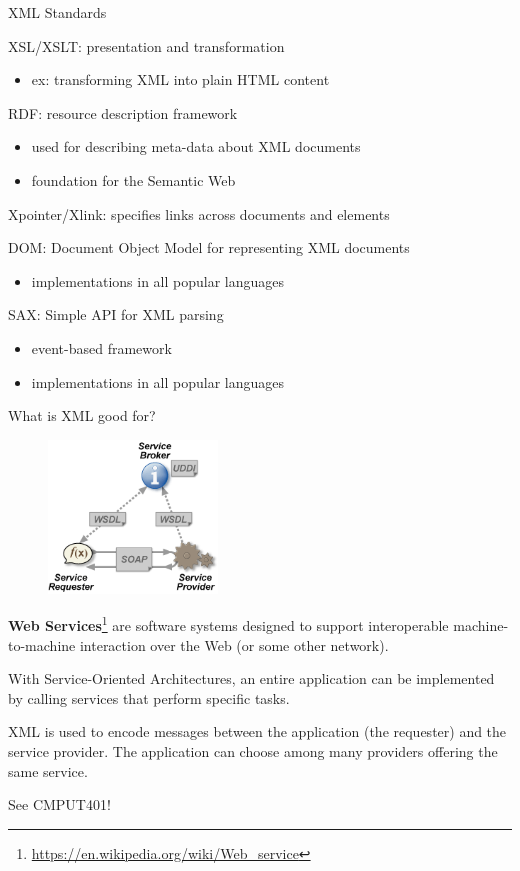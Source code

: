 \begin{frame}{XML Standards}

XSL/XSLT: presentation and transformation
\begin{itemize}[-,topsep=-05pt,noitemsep]
\item ex: transforming XML into plain HTML content
\end{itemize}

RDF: resource description framework 
\begin{itemize}[-,topsep=-5pt,noitemsep]
\item used for describing meta-data about XML documents
\item foundation for the Semantic Web
\end{itemize}

Xpointer/Xlink: specifies links across documents and elements

DOM: Document Object Model for representing XML documents
\begin{itemize}[-,topsep=-5pt,noitemsep]
\item implementations in all popular languages
\end{itemize}


SAX: Simple API for XML parsing
\begin{itemize}[-,topsep=-5pt,noitemsep]
\item event-based framework
\item implementations in all popular languages
\end{itemize}
\end{frame}

\begin{frame}{What is XML good for?}

\begin{figure}
\vspace*{-3em}
\includegraphics[width=0.4\textwidth]{figures/Webservices.png}
\end{figure}

\textbf{Web Services}\footnote{\url{https://en.wikipedia.org/wiki/Web_service}} are software systems designed to support interoperable machine-to-machine interaction over the Web (or some other network). 

With Service-Oriented Architectures, an entire application can be implemented by calling services that perform specific tasks.

XML is used to encode messages between the application (the requester) and the service provider. The application can choose among many providers offering the same service.

See CMPUT401!
\end{frame}


